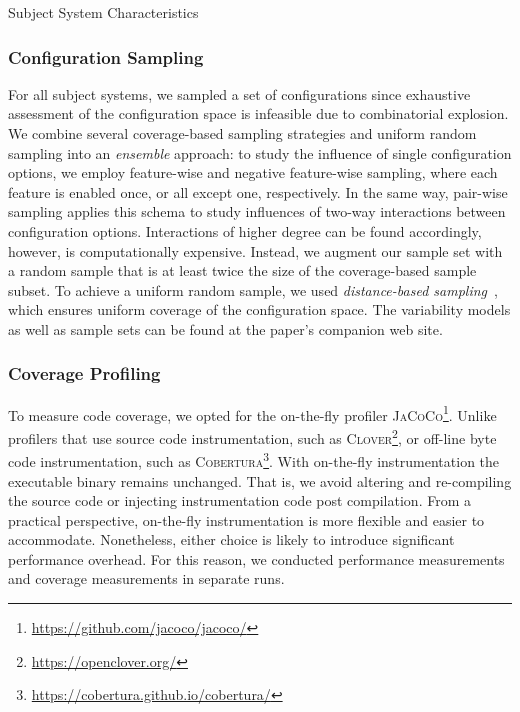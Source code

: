 {	\begin{table}[ht!]
		\centering
		\caption{Subject System Characteristics}
		
		\label{tab:subject_systems}
	\end{table}

	\subsubsection{Configuration Sampling}\label{sec:sampling}
	For all subject systems, we sampled a set of configurations since exhaustive assessment of the configuration space is infeasible due to combinatorial explosion. We combine several coverage-based sampling strategies and uniform random sampling into an \emph{ensemble} approach: to study the influence of single configuration options, we employ feature-wise and negative feature-wise sampling, where each feature is enabled once, or all except one, respectively. In the same way, pair-wise sampling applies this schema to study influences of two-way interactions between configuration options. Interactions of higher degree can be found accordingly, however, is computationally expensive. Instead, we augment our sample set with a random sample that is at least twice the size of the coverage-based sample subset. To achieve a uniform random sample, we used \emph{distance-based sampling}~\cite{kaltenecker_distance-based_2019}, which ensures uniform coverage of the configuration space. The variability models as well as sample sets can be found at the paper's companion web site.
	
	\subsubsection{Coverage Profiling}\label{sec:profiling}
	To measure code coverage, we opted for the on-the-fly profiler \textsc{JaCoCo}\footnote{\url{https://github.com/jacoco/jacoco/}}. Unlike profilers that use source code instrumentation, such as \textsc{Clover}\footnote{\url{https://openclover.org/}}, or off-line byte code instrumentation, such as \textsc{Cobertura}\footnote{\url{https://cobertura.github.io/cobertura/}}. With on-the-fly instrumentation the executable binary remains unchanged. That is, we avoid altering and re-compiling the source code or injecting instrumentation code post compilation. From a practical perspective, on-the-fly instrumentation is more flexible and easier to accommodate. Nonetheless, either choice is likely to introduce significant performance overhead. For this reason, we conducted performance measurements and coverage measurements in separate runs.
	
}
